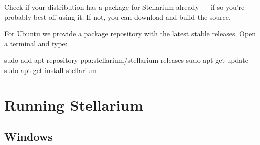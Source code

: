 Check if your distribution has a package for Stellarium already --- if
so you're probably best off using it. If not, you can download and build
the source.

For Ubuntu we provide a package repository with the latest stable
releases. Open a terminal and type:

\begin{commands}
sudo add-apt-repository ppa:stellarium/stellarium-releases
sudo apt-get update
sudo apt-get install stellarium
\end{commands}


\section{Running Stellarium}
\label{sec:GettingStarted:Running}

\subsection{Windows}
\label{sec:GettingStarted:Running:Windows}

